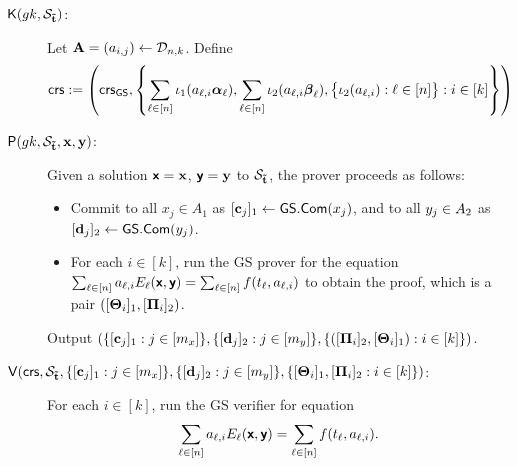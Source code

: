 \begin{description}


\item[$\mathsf{K}({gk}, \mathcal{S}_{\mathbf{\tilde{t}}})$:]
Let $\mathbf{{A}}=(a_{i,j}) \gets \mathcal{D}_{n,k}$. Define 
$$\mathsf{crs}:=\left(\mathsf{crs}_{{\mathsf{GS}}}, \left\{\sum_{\ell\in[n]}\iota_1(a_{\ell,i} {\boldsymbol \alpha}_\ell), \sum_{\ell\in[n]} \iota_2(a_{\ell,i} {\boldsymbol \beta}_\ell), \big\{\iota_{2}(a_{\ell,i}): \ell \in [n]\big\}: i \in [k]\right\}\right)$$
\item[$\mathsf{P}({gk}, \mathcal{S}_{\mathbf{\tilde{t}}},\mathbf{x},\mathbf{y})$:] 
Given a solution $\textbf{\textsf{x}}=\mathbf{x}$,  $\textbf{\textsf{y}}=\mathbf{y}$ to $\mathcal{S}_{\mathbf{\tilde{t}}}$, the prover proceeds as follows:
\begin{itemize}
\item Commit to all $x_j \in A_1$ as $[\mathbf{c}_j]_1\gets\mathsf{GS.Com}(x_j)$, and to all 
$y_j\in A_2$ as $[\mathbf{d}_j]_2\gets\mathsf{GS.Com}(y_j)$.

\item For each $i \in [k]$, run the GS prover for the equation $\sum_{\ell\in[n]} a_{\ell,i} E_{\ell}(\textbf{\textsf{x}},\textbf{\textsf{y}})= \sum_{\ell \in [n]} f(t_{\ell}, a_{\ell,i})$ to obtain the proof, which is a pair  $([\mathbf{{\Theta}}_i]_1,[\mathbf{{\Pi}}_i]_2)$.
\end{itemize}
Output 
$(\{[\mathbf{c}_j]_1 : j \in [m_x]\}, \{[\mathbf{d}_j]_2: j \in [m_y]\}, \{([\mathbf{{\Pi}}_{i}]_2,[\mathbf{{\Theta}}_{i}]_1) : i \in [k]\})$.
\item[$\mathsf{V}(\mathsf{crs},\mathcal{S}_{\mathbf{\tilde{t}}},{\{[\mathbf{c}_j]_1 : j\in[m_x]\},\{[\mathbf{d}_j]_2:j\in[m_y]\}, \{[\mathbf{{\Theta}}_{i}]_1,[\mathbf{{\Pi}}_{i}]_2:i \in [k]\}})$:] For each $i \in [k]$, run the GS verifier for equation
$$\sum_{\ell\in[n]} a_{\ell,i} E_{\ell}(\textbf{\textsf{x}},\textbf{\textsf{y}})= \sum_{\ell \in [n]} f(t_{\ell}, a_{\ell,i}).$$
\end{description}  

